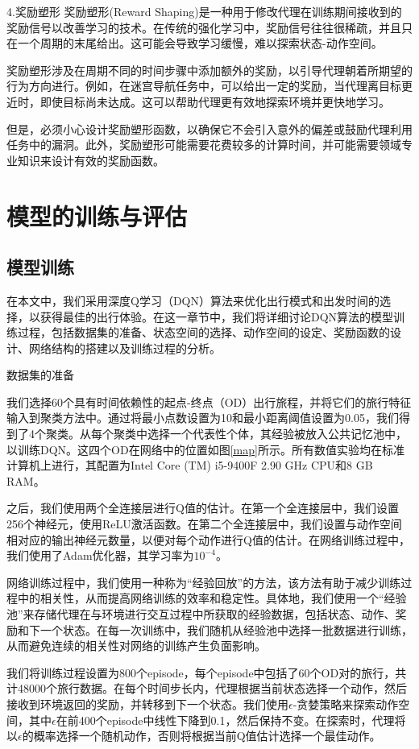 4.奖励塑形
奖励塑形(Reward Shaping)是一种用于修改代理在训练期间接收到的奖励信号以改善学习的技术。在传统的强化学习中，奖励信号往往很稀疏，并且只在一个周期的末尾给出。这可能会导致学习缓慢，难以探索状态-动作空间。

奖励塑形涉及在周期不同的时间步骤中添加额外的奖励，以引导代理朝着所期望的行为方向进行。例如，在迷宫导航任务中，可以给出一定的奖励，当代理离目标更近时，即使目标尚未达成。这可以帮助代理更有效地探索环境并更快地学习。

但是，必须小心设计奖励塑形函数，以确保它不会引入意外的偏差或鼓励代理利用任务中的漏洞。此外，奖励塑形可能需要花费较多的计算时间，并可能需要领域专业知识来设计有效的奖励函数。

\section{模型的训练与评估}

\subsection{模型训练}

在本文中，我们采用深度Q学习（DQN）算法来优化出行模式和出发时间的选择，以获得最佳的出行体验。在这一章节中，我们将详细讨论DQN算法的模型训练过程，包括数据集的准备、状态空间的选择、动作空间的设定、奖励函数的设计、网络结构的搭建以及训练过程的分析。

数据集的准备

我们选择60个具有时间依赖性的起点-终点（OD）出行旅程，并将它们的旅行特征输入到聚类方法中。通过将最小点数设置为10和最小距离阈值设置为0.05，我们得到了4个聚类。从每个聚类中选择一个代表性个体，其经验被放入公共记忆池中，以训练DQN。这四个OD在网络中的位置如图\ref{map}所示。所有数值实验均在标准计算机上进行，其配置为Intel Core (TM) i5-9400F 2.90 GHz CPU和8 GB RAM。

之后，我们使用两个全连接层进行Q值的估计。在第一个全连接层中，我们设置256个神经元，使用ReLU激活函数。在第二个全连接层中，我们设置与动作空间相对应的输出神经元数量，以便对每个动作进行Q值的估计。在网络训练过程中，我们使用了Adam优化器，其学习率为$10^{-4}$。

网络训练过程中，我们使用一种称为“经验回放”的方法，该方法有助于减少训练过程中的相关性，从而提高网络训练的效率和稳定性。具体地，我们使用一个“经验池”来存储代理在与环境进行交互过程中所获取的经验数据，包括状态、动作、奖励和下一个状态。在每一次训练中，我们随机从经验池中选择一批数据进行训练，从而避免连续的相关性对网络的训练产生负面影响。

我们将训练过程设置为800个episode，每个episode中包括了60个OD对的旅行，共计48000个旅行数据。在每个时间步长内，代理根据当前状态选择一个动作，然后接收到环境返回的奖励，并转移到下一个状态。我们使用$\epsilon$-贪婪策略来探索动作空间，其中$\epsilon$在前400个episode中线性下降到0.1，然后保持不变。在探索时，代理将以$\epsilon$的概率选择一个随机动作，否则将根据当前Q值估计选择一个最佳动作。

